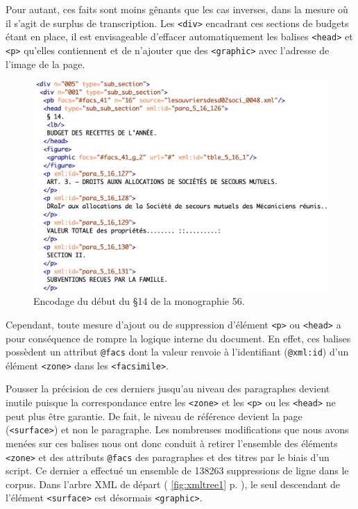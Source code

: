 Pour autant, ces faits sont moins gênants que les cas inverses, dans la mesure où il s'agit de surplus de transcription. Les \texttt{<div>} encadrant ces sections de budgets étant en place, il est envisageable d'effacer automatiquement les balises \texttt{<head>} et \texttt{<p>} qu'elles contiennent et de n'ajouter que des \texttt{<graphic>} avec l'adresse de l'image de la page.

\begin{figure}
    \centering
    \includegraphics[width=15cm]{img/table_s2t2_chapt_5.png}
    \caption{Encodage du début du §14 de la monographie 56.}
    \label{fig:tableodm56xml}
\end{figure}

Cependant, toute mesure d'ajout ou de suppression d'élément \texttt{<p>} ou \texttt{<head>} a pour conséquence de rompre la logique interne du document. En effet, ces balises possèdent un attribut \texttt{@facs} dont la valeur renvoie à l'identifiant (\texttt{@xml:id}) d'un élément \texttt{<zone>} dans les \texttt{<facsimile>}.

Pousser la précision de ces derniers jusqu'au niveau des paragraphes devient inutile puisque la correspondance entre les \texttt{<zone>} et les \texttt{<p>} ou les \texttt{<head>} ne peut plus 
être garantie. De fait, le niveau de référence devient la page (\texttt{<surface>}) et non le paragraphe. Les nombreuses modifications que nous avons menées sur ces balises nous ont donc conduit à retirer l'ensemble des éléments \texttt{<zone>} et des attributs \texttt{@facs} des paragraphes et des titres par le biais d'un script. Ce dernier a effectué un ensemble de 138263 suppressions de ligne dans le corpus. Dans l'arbre XML de départ (\fig{} \ref{fig:xmltree1} p. \pageref{fig:xmltree1}), le seul descendant de l'élément \texttt{<surface>} est désormais \texttt{<graphic>}.

